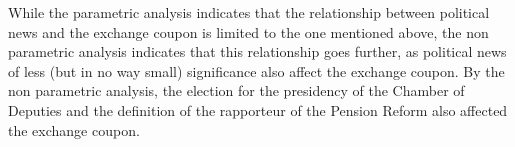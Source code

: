 \documentclass[a4paper]{article}
\begin{document}
While the parametric analysis indicates that the relationship between political news and the exchange coupon is limited to the one mentioned above, the non parametric analysis indicates that this relationship goes further, as political news of less (but in no way small) significance also affect the exchange coupon. By the non parametric analysis, the election for the presidency of the Chamber of Deputies and the definition of the rapporteur of the Pension Reform also affected the exchange coupon.





\begin{comment}

The best forecast for the asset price in the next period is always the current price. (quem disse isso? acho que propio Fama)
The best estimate for the asset return in the long term is always the normal return for the risk of the asset (quem fisse isso?)

\end{comment}
\end{document}
